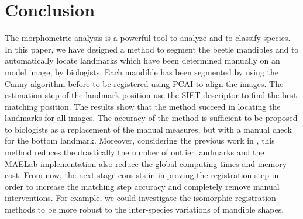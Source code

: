 \documentclass[twoside,twocolumn,10pt]{article}
\begin{document}
\section{Conclusion}

The morphometric analysis is a powerful tool to analyze and to
classify species. 
In this paper, we have designed a method to segment the beetle mandibles
and to automatically locate landmarks which have been determined
manually on an model image, by biologists.
Each mandible has been segmented by using the Canny algorithm before to be registered using PCAI to align the images.
The estimation step of the landmark position use the SIFT descriptor to find the best matching position.
The results show that the method succeed in locating the landmarks for all images.
The accuracy of the method is sufficient to be proposed to biologists
as a replacement of the manual measures, but with a manual check for
the bottom landmark. Moreover, considering the previous work in
\cite{leestimating}, this method reduces the drastically the number of
outlier landmarks and the MAELab implementation also reduce the global
computing times and memory cost. From now, the next stage consists in
improving the registration step in order to increase the matching step
accuracy and completely remove manual interventions. For example, we
could investigate the isomorphic registration methods to be more
robust to the inter-species variations of mandible shapes.







\end{document}
